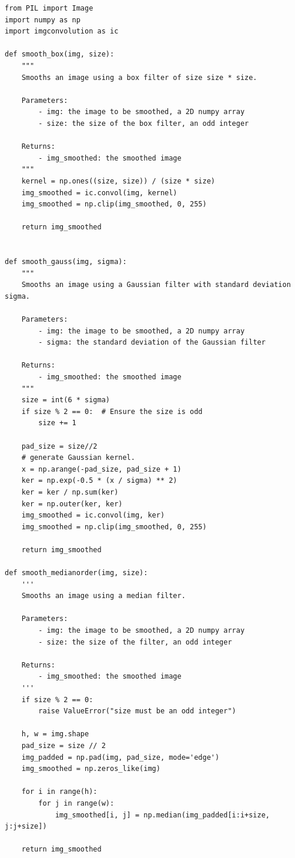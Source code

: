 \documentclass[UTF8]{ctexart}
\begin{document}
\begin{lstlisting}
from PIL import Image
import numpy as np
import imgconvolution as ic

def smooth_box(img, size):
    """
    Smooths an image using a box filter of size size * size.
    
    Parameters:
        - img: the image to be smoothed, a 2D numpy array
        - size: the size of the box filter, an odd integer
        
    Returns:
        - img_smoothed: the smoothed image
    """
    kernel = np.ones((size, size)) / (size * size)
    img_smoothed = ic.convol(img, kernel)
    img_smoothed = np.clip(img_smoothed, 0, 255)

    return img_smoothed


def smooth_gauss(img, sigma):
    """
    Smooths an image using a Gaussian filter with standard deviation sigma.
    
    Parameters:
        - img: the image to be smoothed, a 2D numpy array
        - sigma: the standard deviation of the Gaussian filter
        
    Returns:
        - img_smoothed: the smoothed image
    """
    size = int(6 * sigma)
    if size % 2 == 0:  # Ensure the size is odd
        size += 1
    
    pad_size = size//2
    # generate Gaussian kernel.
    x = np.arange(-pad_size, pad_size + 1)
    ker = np.exp(-0.5 * (x / sigma) ** 2)
    ker = ker / np.sum(ker)
    ker = np.outer(ker, ker)
    img_smoothed = ic.convol(img, ker)
    img_smoothed = np.clip(img_smoothed, 0, 255)
    
    return img_smoothed

def smooth_medianorder(img, size):
    '''
    Smooths an image using a median filter.
    
    Parameters:
        - img: the image to be smoothed, a 2D numpy array
        - size: the size of the filter, an odd integer
        
    Returns:
        - img_smoothed: the smoothed image
    '''
    if size % 2 == 0:
        raise ValueError("size must be an odd integer")
    
    h, w = img.shape
    pad_size = size // 2
    img_padded = np.pad(img, pad_size, mode='edge')
    img_smoothed = np.zeros_like(img)
    
    for i in range(h):
        for j in range(w):
            img_smoothed[i, j] = np.median(img_padded[i:i+size, j:j+size])
            
    return img_smoothed
\end{lstlisting}
\end{document}

